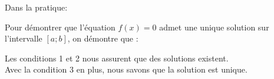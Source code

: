 \begin{bmanip}
	Dans la pratique:
	
	Pour démontrer que l'équation \(f(x)=0\) admet une unique solution sur l'intervalle \([a ; b]\), on démontre que :
	
	\begin{enumMet}
		\item {}\pointilles[\textwidth-0.5cm]
		\item {}\pointilles[\textwidth-0.5cm]
		\item {}\pointilles[\textwidth-0.5cm]
	\end{enumMet}
	
	Les conditions 1 et 2 nous assurent que des solutions existent.\\
	Avec la condition 3 en plus, nous savons que la solution est unique.
	
\end{bmanip}

